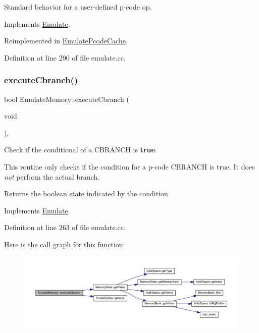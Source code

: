 Standard behavior for a user-\/defined p-\/code op. 



Implements \mbox{\hyperlink{class_emulate_ab60a8c9f009c0ce388bb2b6eef50a50b}{Emulate}}.



Reimplemented in \mbox{\hyperlink{class_emulate_pcode_cache_a5f90b72957b644a794455f051cb3ad2d}{Emulate\+Pcode\+Cache}}.



Definition at line 290 of file emulate.\+cc.

\mbox{\label{class_emulate_memory_a098137ac05d9118162a1d0aaa5506d0b}} 
\subsubsection{\texorpdfstring{executeCbranch()}{executeCbranch()}}
{\footnotesize\ttfamily bool Emulate\+Memory\+::execute\+Cbranch (\begin{DoxyParamCaption}\item[{void}]{ }\end{DoxyParamCaption})\hspace{0.3cm}{\ttfamily [protected]}, {\ttfamily [virtual]}}



Check if the conditional of a C\+B\+R\+A\+N\+CH is {\bfseries{true}}. 

This routine only checks if the condition for a p-\/code C\+B\+R\+A\+N\+CH is true. It does {\itshape not} perform the actual branch. \begin{DoxyReturn}{Returns}
the boolean state indicated by the condition 
\end{DoxyReturn}


Implements \mbox{\hyperlink{class_emulate_ac0dbab7129d69471d8400a75c0c7c1b5}{Emulate}}.



Definition at line 263 of file emulate.\+cc.

Here is the call graph for this function\+:
\nopagebreak
\begin{figure}[H]
\begin{center}
\leavevmode
\includegraphics[width=350pt]{class_emulate_memory_a098137ac05d9118162a1d0aaa5506d0b_cgraph}
\end{center}
\end{figure}
\mbox{\label{class_emulate_memory_a057928f5f600a75a356d8e8e72e8c2cc}} 
